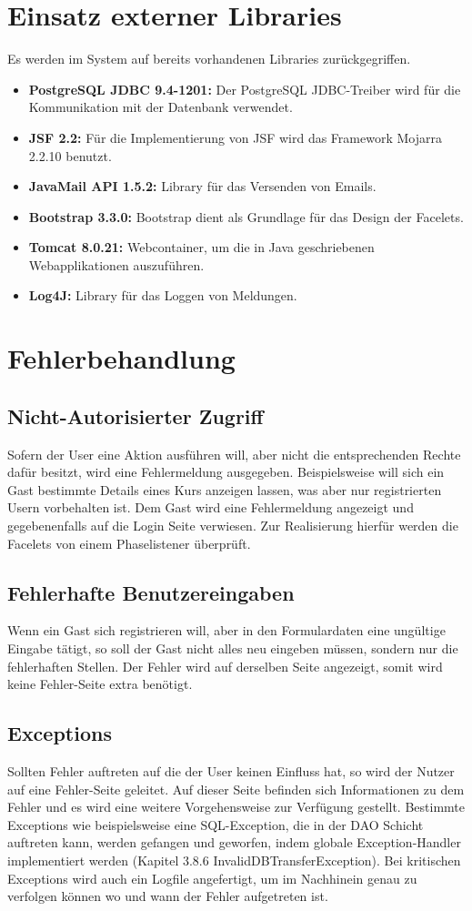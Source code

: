 \section{Einsatz externer Libraries}
Es werden im System auf bereits vorhandenen Libraries zurückgegriffen.
	\begin{itemize}
		\item \textbf{PostgreSQL JDBC 9.4-1201:} Der PostgreSQL JDBC-Treiber wird für die Kommunikation mit der Datenbank verwendet.
		\item \textbf{JSF 2.2:} Für die Implementierung von JSF wird das Framework Mojarra 2.2.10 benutzt.
		\item \textbf{JavaMail API 1.5.2:} Library für das Versenden von Emails.
		\item \textbf{Bootstrap 3.3.0:} Bootstrap dient als Grundlage für das Design der Facelets.
		\item \textbf{Tomcat 8.0.21:} Webcontainer, um die in Java geschriebenen Webapplikationen auszuführen.
		\item \textbf{Log4J:} Library für das Loggen von Meldungen.
	\end{itemize}
\section{Fehlerbehandlung}
	\subsection{Nicht-Autorisierter Zugriff}
	Sofern der User eine Aktion ausführen will, aber nicht die entsprechenden Rechte dafür besitzt, wird eine Fehlermeldung ausgegeben. Beispielsweise will sich ein Gast bestimmte Details eines Kurs anzeigen lassen, was aber nur registrierten Usern vorbehalten ist. Dem Gast wird eine Fehlermeldung angezeigt und gegebenenfalls auf die Login Seite verwiesen. Zur Realisierung hierfür werden die Facelets von einem Phaselistener überprüft.
	\subsection{Fehlerhafte Benutzereingaben}
	Wenn ein Gast sich registrieren will, aber in den Formulardaten eine ungültige Eingabe tätigt, so soll der Gast nicht alles neu eingeben müssen, sondern nur die fehlerhaften Stellen. Der Fehler wird auf derselben Seite angezeigt, somit wird keine Fehler-Seite extra benötigt.
	\subsection{Exceptions}
	Sollten Fehler auftreten auf die der User keinen Einfluss hat, so wird der Nutzer auf eine Fehler-Seite geleitet. Auf dieser Seite befinden sich Informationen zu dem Fehler und es wird eine weitere Vorgehensweise zur Verfügung gestellt. Bestimmte Exceptions wie beispielsweise eine SQL-Exception, die in der DAO Schicht auftreten kann, werden gefangen und geworfen, indem globale Exception-Handler implementiert werden (Kapitel 3.8.6 InvalidDBTransferException). Bei kritischen Exceptions wird auch ein Logfile angefertigt, um im Nachhinein genau zu verfolgen können wo und wann der Fehler aufgetreten ist.
